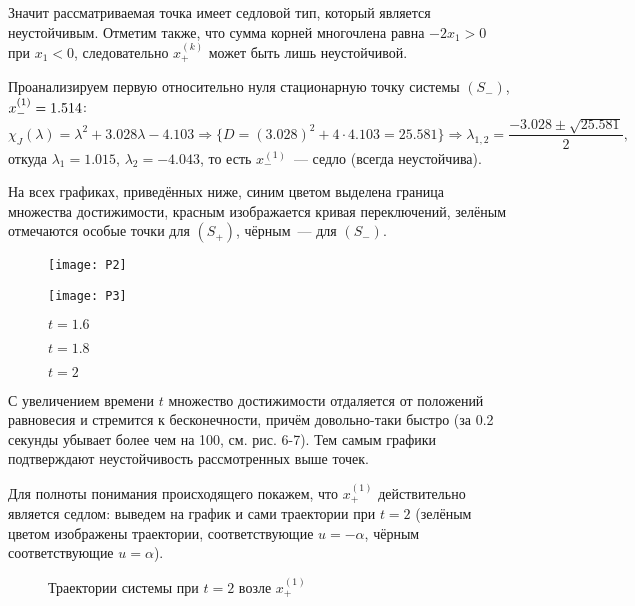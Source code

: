 \documentclass[a4paper,12pt]{article}
\newcommand{\hm}[1]{#1\nobreak\discretionary{}{\hbox{\ensuremath{#1}}}{}}
\begin{document}
Значит рассматриваемая точка имеет седловой тип, который является неустойчивым. Отметим также, что сумма корней многочлена равна $-2x_1 > 0$ при $x_1 < 0$, следовательно $x_{+}^{(k)}$ может быть лишь неустойчивой. 

Проанализируем первую относительно нуля стационарную точку системы $(S_{-})$, $x_{-}^{(1)} \hm = 1.514$:
$$ \chi_{J}(\lambda) = \lambda^2 + 3.028 \lambda - 4.103 \Rightarrow \{ D = (3.028)^2 + 4 \cdot 4.103 = 25.581 \} \Rightarrow \lambda_{1, 2} = \dfrac{-3.028 \pm \sqrt{25.581}}{2}, $$
откуда $\lambda_1 = 1.015$, $\lambda_2 = -4.043$, то есть $x_{-}^{(1)}$~--- седло (всегда неустойчива). 

На всех графиках, приведённых ниже, синим цветом выделена граница множества достижимости, красным изображается кривая переключений, зелёным отмечаются особые точки для $(S_{+})$, чёрным~--- для $(S_{-})$.

\begin{figure}[H]
\begin{minipage}[h]{0.49\linewidth}
\texttt{[image: P2]}
	\caption{$t = 1.2$}
\end{minipage}
\hfill
\begin{minipage}[h]{0.49\linewidth}
\texttt{[image: P3]}
	\caption{$t = 1.6$}
\end{minipage}
\end{figure}	

\begin{figure}[H]
	\centering{\texttt{[image: P4]}}
	\caption{$t = 1.8$}
\end{figure}

\begin{figure}[H]
	\centering{\texttt{[image: P5]}}
	\caption{$t = 2$}
\end{figure}
С увеличением времени $t$ множество достижимости отдаляется от положений равновесия и стремится к бесконечности, причём довольно-таки быстро (за 0.2 секунды убывает более чем на 100, см. рис. 6-7). Тем самым графики подтверждают неустойчивость рассмотренных выше точек. 

Для полноты понимания происходящего покажем, что $x_{+}^{(1)}$ действительно является седлом: выведем на график и сами траектории при $t = 2$ (зелёным цветом изображены траектории, соответствующие $u = -\alpha$, чёрным соответствующие $u = \alpha$).
\begin{figure}[H]
	\centering{\texttt{[image: P6]}}
	\caption{Траектории системы при $t = 2$ возле $x_{+}^{(1)}$}
\end{figure}
\end{document}
